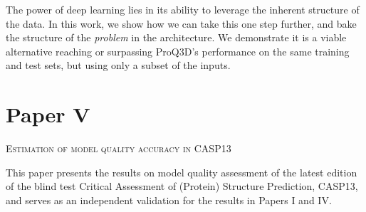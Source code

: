 \noindent
The power of deep learning lies in its ability to leverage the inherent structure of the data.
In this work, we show how we can take this one step further, and bake the structure of the \emph{problem} in the architecture.
We demonstrate it is a viable alternative reaching or surpassing ProQ3D's performance on the same training and test sets, but using only a subset of the inputs.

\section*{Paper V}
\begin{center}
	\textsc{Estimation of model quality accuracy in CASP13}
\end{center}

\noindent
This paper presents the results on model quality assessment of the latest edition of the blind test Critical Assessment of (Protein) Structure Prediction, CASP13,
and serves as an independent validation for the results in Papers I and IV.
